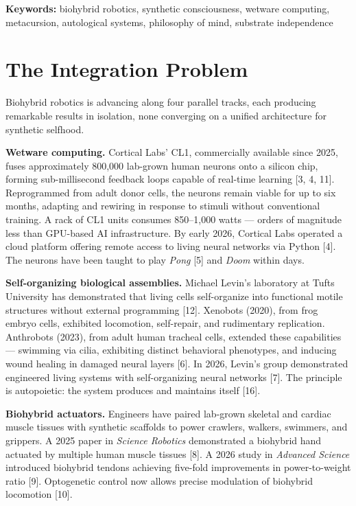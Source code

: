 \documentclass[12pt, letterpaper]{article}
\begin{document}
\vspace{1em}

\noindent\textbf{Keywords:} biohybrid robotics, synthetic consciousness, wetware computing, metacursion, autological systems, philosophy of mind, substrate independence

\newpage
\setcounter{page}{1}
\onehalfspacing

\section{The Integration Problem}

Biohybrid robotics is advancing along four parallel tracks, each producing remarkable results in isolation, none converging on a unified architecture for synthetic selfhood.

\textbf{Wetware computing.} Cortical Labs' CL1, commercially available since 2025, fuses approximately 800,000 lab-grown human neurons onto a silicon chip, forming sub-millisecond feedback loops capable of real-time learning [3, 4, 11]. Reprogrammed from adult donor cells, the neurons remain viable for up to six months, adapting and rewiring in response to stimuli without conventional training. A rack of CL1 units consumes 850--1,000 watts --- orders of magnitude less than GPU-based AI infrastructure. By early 2026, Cortical Labs operated a cloud platform offering remote access to living neural networks via Python [4]. The neurons have been taught to play \textit{Pong} [5] and \textit{Doom} within days.

\textbf{Self-organizing biological assemblies.} Michael Levin's laboratory at Tufts University has demonstrated that living cells self-organize into functional motile structures without external programming [12]. Xenobots (2020), from frog embryo cells, exhibited locomotion, self-repair, and rudimentary replication. Anthrobots (2023), from adult human tracheal cells, extended these capabilities --- swimming via cilia, exhibiting distinct behavioral phenotypes, and inducing wound healing in damaged neural layers [6]. In 2026, Levin's group demonstrated engineered living systems with self-organizing neural networks [7]. The principle is autopoietic: the system produces and maintains itself [16].

\textbf{Biohybrid actuators.} Engineers have paired lab-grown skeletal and cardiac muscle tissues with synthetic scaffolds to power crawlers, walkers, swimmers, and grippers. A 2025 paper in \textit{Science Robotics} demonstrated a biohybrid hand actuated by multiple human muscle tissues [8]. A 2026 study in \textit{Advanced Science} introduced biohybrid tendons achieving five-fold improvements in power-to-weight ratio [9]. Optogenetic control now allows precise modulation of biohybrid locomotion [10].
\end{document}
